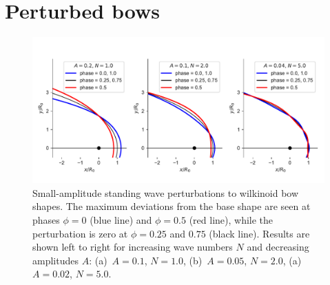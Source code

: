 
\section{Perturbed bows}
\label{sec:perturbed-bows}

\begin{figure}[t!]
  \centering
  \includegraphics[width=\linewidth]{figs/compare_xyprime_wave-wilkinoid}
  \caption{Small-amplitude standing wave perturbations to wilkinoid
    bow shapes.  The maximum deviations from the base shape are seen
    at phases \(\phi = 0\) (blue line) and \(\phi = 0.5\) (red line), while
    the perturbation is zero at \(\phi = 0.25\) and \(0.75\) (black
    line).  Results are shown left to right for increasing wave
    numbers \(N\) and decreasing amplitudes \(A\): (a)~\(A = 0.1\),
    \(N = 1.0\), (b)~\(A = 0.05\), \(N = 2.0\), (a)~\(A = 0.02\),
    \(N = 5.0\).}
  \label{fig:perturb-shapes}
\end{figure}

